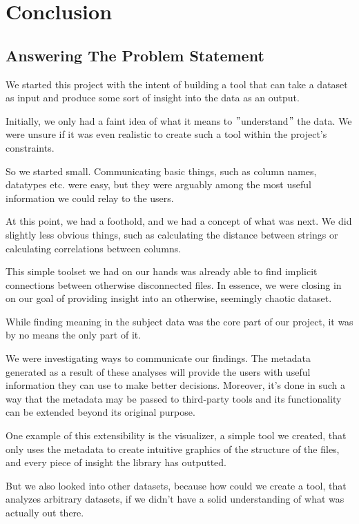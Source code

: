 \chapter{Conclusion}\label{ch:conclusion}

\section{Answering The Problem Statement}
We started this project with the intent of building a tool that can take a dataset as input
and produce some sort of insight into the data as an output.

Initially, we only had a faint idea of what it means to \("\)understand\("\)
the data.
We were unsure if it was even realistic to create such a tool within the project's constraints.

So we started small.
Communicating basic things, such as column names, datatypes etc.
were easy, but they were arguably among the most useful information we could relay to the users.

At this point, we had a foothold, and we had a concept of what was next.
We did slightly less obvious things, such as calculating the distance between strings or
calculating correlations between columns.

This simple toolset we had on our hands was already able to find implicit connections between
otherwise disconnected files.
In essence, we were closing in on our goal of providing insight into an otherwise, seemingly chaotic
dataset.

While finding meaning in the subject data was the core part of our project,
it was by no means the only part of it.

We were investigating ways to communicate our findings.
The metadata generated as a result of these analyses will provide the users with useful information
they can use to make better decisions.
Moreover, it's done in such a way that the metadata may be passed to third-party tools and
its functionality can be extended beyond its original purpose.

One example of this extensibility is the visualizer, a simple tool we created, that only
uses the metadata to create intuitive graphics of the structure of the files, and
every piece of insight the library has outputted.

But we also looked into other datasets,
because how could we create a tool, that analyzes arbitrary datasets, if
we didn't have a solid understanding of what was actually out there.

